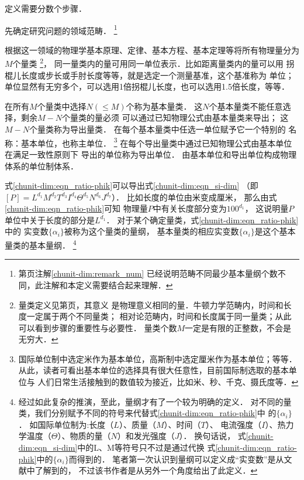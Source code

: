 \begin{definition}\label{chunit-dim:du}
    定义需要分数个步骤．

先确定研究问题的领域范畴．
    {\footnote{第\pageref{chunit-dim:remark_num}页注解\ref{chunit-dim:remark_num}
    已经说明范畴不同最少基本量纲个数不同，此注解和本定义需要结合起来理解．}}

根据这一领域的物理学基本原理、定律、基本方程、基本定理等将所有物理量分为$M$个量类
{\footnote{量类定义见第\pageref{chunit-dim:quantity-class}页，其意义
是物理意义相同的量．牛顿力学范畴内，时间和长度一定属于两个不同量类；
相对论范畴内，时间和长度属于同一量类；从此可以看到步骤的重要性与必要性．
量类个数$M$一定是有限的正整数，不会是无穷大．}}，
同一量类内的量可用同一单位表示．比如距离量类内的量可以用
拐棍儿长度或步长或手肘长度等等，就是选定一个测量基准，这个基准称为
{\heiti 单位}；单位显然有无穷多个，可以选用1倍拐棍儿长度，也可以选用1.5倍长度，等等．

在所有$M$个量类中选择$N(\leqslant M)$个称为{\heiti 基本量类}．
这$N$个基本量类不能任意选择，剩余$M-N$个量类的量必须
可以通过已知物理公式由基本量类来导出；
这$M-N$个量类称为{\heiti 导出量类}．
在每个基本量类中任选一单位赋予它一个特别的
名称：{\heiti 基本单位}，也称{\heiti 主单位}．
{\footnote{国际单位制中选定{\kaishu 米}作为基本单位，高斯制中选定{\kaishu 厘米}作为基本单位；等等．
        从此，读者可看出基本单位的选择具有很大任意性，目前国际制选取的基本单位与
        人们日常生活接触到的数值较为接近，比如米、秒、千克、摄氏度等．}}
在每个导出量类中通过已知物理公式由基本单位在满足{\kaishu 一致性原则}下
导出的单位称为{\heiti 导出单位}．
由基本单位和导出单位构成物理体系的{\heiti 单位制体系}．

式\eqref{chunit-dim:eqn_ratio-phik}可以导出式\eqref{chunit-dim:eqn_si-dim}
（即$ [P]=\si{L}^{d_1} \si{M}^{d_2} \si{T}^{d_3} \si{I}^{d_4} \Theta^{d_5} \si{N}^{d_6} \si{J}^{d_7}$）．
比如长度的单位由{\kaishu 米}变成{\kaishu 厘米}，
那么由式\eqref{chunit-dim:eqn_ratio-phik}可知
物理量$P$中有关长度部分变为$100^{d_1}$，
这说明量$P$单位中关于长度的部分是$\si{L}^{d_1}$．
对于某个确定量类，式\eqref{chunit-dim:eqn_ratio-phik}中的
实变数$\{\alpha_i\}$被称为这个量类的{\heiti 量纲}，
基本量类的相应实变数$\{\alpha_i\}$是这个基本量类的{\heiti 基本量纲}．
{\footnote{经过如此复杂的推演，至此，量纲才有了一个较为明确的定义．
对不同的量类，我们分别赋予不同的符号来代替式\eqref{chunit-dim:eqn_ratio-phik}中
的$\{\alpha_i\}$．
如国际单位制为:长度（$\si{L}$）、质量（$\si{M}$）、时间（$\si{T}$）、
电流强度（$\si{I}$）、热力学温度（$\Theta$）、物质的量（$\si{N}$）和发光强度（$\si{J}$）．
换句话说，
式\eqref{chunit-dim:eqn_si-dim}中的\si{L}、\si{M}等符号只不过是通过代换
式\eqref{chunit-dim:eqn_ratio-phik}中的$\{\alpha_i\}$而得到的．
笔者第一次认识到量纲可以定义成“实变数”是从文献\parencite[\S 1.4]{liang_cao2020}中了解到的，
不过该书作者是从另外一个角度给出了此定义．}}
\end{definition}

